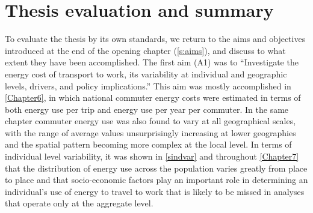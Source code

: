 \section{Thesis evaluation and summary} \label{ssummary}
To evaluate the thesis by its own standards, we return to the aims and
objectives introduced at the end of the opening chapter (\cref{s:aims}), and
discuss to what extent they have been accomplished.  The first aim (A1) was to
``Investigate the energy cost of transport to work, its variability
at individual and geographic levels, drivers, and policy implications.'' This
aim was mostly accomplished in \cref{Chapter6}, in which national commuter
energy costs were estimated in terms of both energy use per trip and energy use
per year per commuter. In the same chapter commuter energy use was also found
to vary at all geographical scales, with the range of average values
unsurprisingly increasing at lower geographies and the spatial pattern becoming
more complex at the local level. In terms of individual level variability, it
was shown in \cref{sindvar} and throughout \cref{Chapter7} that the distribution
of energy use across the population varies greatly from place to place and that
socio-economic factors play an important role in determining an individual's
use of energy to travel to work that is likely to be missed in analyses that
operate only at the aggregate level. 

